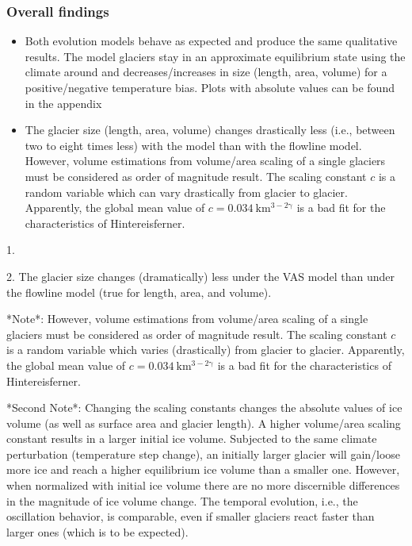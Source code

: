       \subsubsection*{Overall findings}

      \begin{itemize}
        \item Both evolution models behave as expected and produce the same qualitative results. The model glaciers stay in an approximate equilibrium state using the climate around \tstar and decreases/increases in size (length, area, volume) for a positive/negative temperature bias. Plots with absolute values can be found in the appendix %
        \item The glacier size (length, area, volume) changes drastically less (i.e., between two to eight times less) with the \vas{} model than with the flowline model.
        However, volume estimations from volume/area scaling of a single glaciers must be considered as order of magnitude result. The scaling constant $c$ is a random variable which can vary drastically from glacier to glacier. Apparently, the global mean value of $c=0.034\ \mathrm{km^{3-2\gamma}}$ is a bad fit for the characteristics of Hintereisferner.
      \end{itemize}
      

      1. 

      2. The glacier size changes (dramatically) less under the VAS model than under the flowline model (true for length, area, and volume).

         *Note*: However, volume estimations from volume/area scaling of a single glaciers must be considered as order of magnitude result. The scaling constant $c$ is a random variable which varies (drastically) from glacier to glacier. Apparently, the global mean value of $c=0.034\ \mathrm{km^{3-2\gamma}}$ is a bad fit for the characteristics of Hintereisferner.

         *Second Note*: Changing the scaling constants changes the absolute values of ice volume (as well as surface area and glacier length). A higher volume/area scaling constant results in a larger initial ice volume. Subjected to the same climate perturbation (temperature step change), an initially larger glacier will gain/loose more ice and reach a higher equilibrium ice volume than a smaller one. However, when normalized with initial ice volume there are no more discernible differences in the magnitude of ice volume change. The temporal evolution, i.e., the oscillation behavior, is comparable, even if smaller glaciers react faster than larger ones (which is to be expected).

